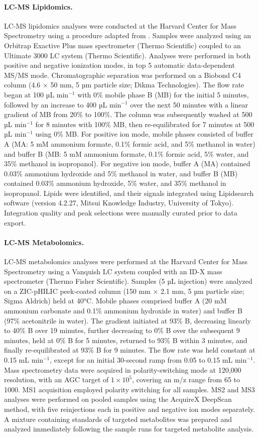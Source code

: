 \paragraph{LC-MS Lipidomics.}
LC-MS lipidomics analyses were conducted at the Harvard Center for Mass Spectrometry using a procedure adapted from \cite{Miraldi2013-ng}. Samples were analyzed using an Orbitrap Exactive Plus mass spectrometer (Thermo Scientific) coupled to an Ultimate 3000 LC system (Thermo Scientific). Analyses were performed in both positive and negative ionization modes, in top 5 automatic data-dependent MS/MS mode. Chromatographic separation was performed on a Biobond C4 column (4.6 $\times$ 50 mm, 5 µm particle size; Dikma Technologies). The flow rate began at 100 µL min$^{-1}$ with 0\% mobile phase B (MB) for the initial 5 minutes, followed by an increase to 400 µL min$^{-1}$ over the next 50 minutes with a linear gradient of MB from 20\% to 100\%. The column was subsequently washed at 500 µL min$^{-1}$ for 8 minutes with 100\% MB, then re-equilibrated for 7 minutes at 500 µL min$^{-1}$ using 0\% MB. For positive ion mode, mobile phases consisted of buffer A (MA: 5 mM ammonium formate, 0.1\% formic acid, and 5\% methanol in water) and buffer B (MB: 5 mM ammonium formate, 0.1\% formic acid, 5\% water, and 35\% methanol in isopropanol). For negative ion mode, buffer A (MA) contained 0.03\% ammonium hydroxide and 5\% methanol in water, and buffer B (MB) contained 0.03\% ammonium hydroxide, 5\% water, and 35\% methanol in isopropanol. Lipids were identified, and their signals integrated using Lipidsearch software (version 4.2.27, Mitsui Knowledge Industry, University of Tokyo). Integration quality and peak selections were manually curated prior to data export.

\paragraph{LC-MS Metabolomics.}
LC-MS metabolomics analyses were performed at the Harvard Center for Mass Spectrometry using a Vanquish LC system coupled with an ID-X mass spectrometer (Thermo Fisher Scientific). Samples (5 µL injection) were analyzed on a ZIC-pHILIC peek-coated column (150 mm $\times$ 2.1 mm, 5 µm particle size; Sigma Aldrich) held at 40°C. Mobile phases comprised buffer A (20 mM ammonium carbonate and 0.1\% ammonium hydroxide in water) and buffer B (97\% acetonitrile in water). The gradient initiated at 93\% B, decreasing linearly to 40\% B over 19 minutes, further decreasing to 0\% B over the subsequent 9 minutes, held at 0\% B for 5 minutes, returned to 93\% B within 3 minutes, and finally re-equilibrated at 93\% B for 9 minutes. The flow rate was held constant at 0.15 mL min$^{-1}$, except for an initial 30-second ramp from 0.05 to 0.15 mL min$^{-1}$. Mass spectrometry data were acquired in polarity-switching mode at 120,000 resolution, with an AGC target of $1 \times 10^5$, covering an m/z range from 65 to 1000. MS1 acquisition employed polarity switching for all samples. MS2 and MS3 analyses were performed on pooled samples using the AcquireX DeepScan method, with five reinjections each in positive and negative ion modes separately. A mixture containing standards of targeted metabolites was prepared and analyzed immediately following the sample runs for targeted metabolite analysis.
